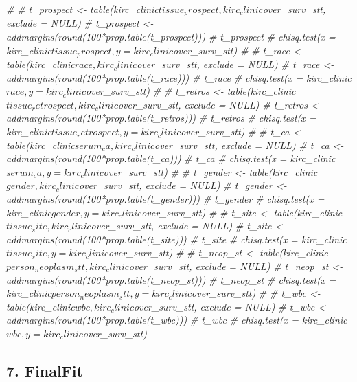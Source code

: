 \documentclass[]{article}
\newenvironment{Shaded}{\begin{snugshade}}{\end{snugshade}}
\newcommand{\CommentTok}[1]{\textcolor[rgb]{0.56,0.35,0.01}{\textit{#1}}}
\begin{document}
\begin{Shaded}
\begin{Highlighting}[]
\CommentTok{# }
\CommentTok{# t_prospect <- table(kirc_clinic$tissue_prospect, kirc_clinic$over_surv_stt, exclude = NULL)}
\CommentTok{# t_prospect <- addmargins(round(100*prop.table(t_prospect)))}
\CommentTok{# t_prospect}
\CommentTok{# chisq.test(x = kirc_clinic$tissue_prospect, y = kirc_clinic$over_surv_stt)}
\CommentTok{# }
\CommentTok{# t_race <- table(kirc_clinic$race, kirc_clinic$over_surv_stt, exclude = NULL)}
\CommentTok{# t_race <- addmargins(round(100*prop.table(t_race)))}
\CommentTok{# t_race}
\CommentTok{# chisq.test(x = kirc_clinic$race, y = kirc_clinic$over_surv_stt) }
\CommentTok{# }
\CommentTok{# t_retros <- table(kirc_clinic$tissue_retrospect, kirc_clinic$over_surv_stt, exclude = NULL)}
\CommentTok{# t_retros <- addmargins(round(100*prop.table(t_retros)))}
\CommentTok{# t_retros}
\CommentTok{# chisq.test(x = kirc_clinic$tissue_retrospect, y = kirc_clinic$over_surv_stt)}
\CommentTok{# }
\CommentTok{# t_ca <- table(kirc_clinic$serum_ca, kirc_clinic$over_surv_stt, exclude = NULL)}
\CommentTok{# t_ca <- addmargins(round(100*prop.table(t_ca)))}
\CommentTok{# t_ca}
\CommentTok{# chisq.test(x = kirc_clinic$serum_ca, y = kirc_clinic$over_surv_stt) }
\CommentTok{# }
\CommentTok{# t_gender <- table(kirc_clinic$gender, kirc_clinic$over_surv_stt, exclude = NULL)}
\CommentTok{# t_gender <- addmargins(round(100*prop.table(t_gender)))}
\CommentTok{# t_gender}
\CommentTok{# chisq.test(x = kirc_clinic$gender, y = kirc_clinic$over_surv_stt) }
\CommentTok{# }
\CommentTok{# t_site <- table(kirc_clinic$tissue_site, kirc_clinic$over_surv_stt, exclude = NULL)}
\CommentTok{# t_site <- addmargins(round(100*prop.table(t_site)))}
\CommentTok{# t_site}
\CommentTok{# chisq.test(x = kirc_clinic$tissue_site, y = kirc_clinic$over_surv_stt) }
\CommentTok{# }
\CommentTok{# t_neop_st <- table(kirc_clinic$person_neoplasm_stt, kirc_clinic$over_surv_stt, exclude = NULL)}
\CommentTok{# t_neop_st <- addmargins(round(100*prop.table(t_neop_st)))}
\CommentTok{# t_neop_st}
\CommentTok{# chisq.test(x = kirc_clinic$person_neoplasm_stt, y = kirc_clinic$over_surv_stt) }
\CommentTok{# }
\CommentTok{# t_wbc <- table(kirc_clinic$wbc, kirc_clinic$over_surv_stt, exclude = NULL)}
\CommentTok{# t_wbc <- addmargins(round(100*prop.table(t_wbc)))}
\CommentTok{# t_wbc}
\CommentTok{# chisq.test(x = kirc_clinic$wbc, y = kirc_clinic$over_surv_stt) }
\end{Highlighting}
\end{Shaded}

\subsection{7. FinalFit}\label{finalfit}
\end{document}
